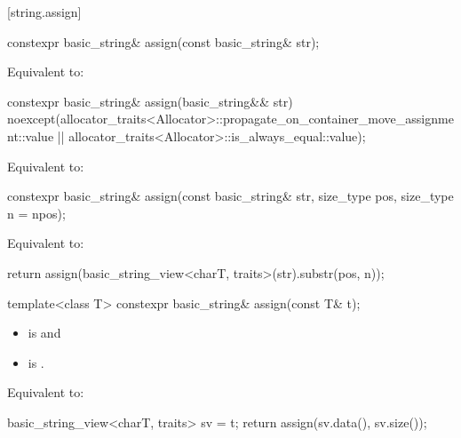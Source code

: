 [string.assign]{}

%
\begin{itemdecl}
constexpr basic_string& assign(const basic_string& str);
\end{itemdecl}

\begin{itemdescr}
\pnum
\effects
Equivalent to: 
\end{itemdescr}

%
\begin{itemdecl}
constexpr basic_string& assign(basic_string&& str)
  noexcept(allocator_traits<Allocator>::propagate_on_container_move_assignment::value ||
           allocator_traits<Allocator>::is_always_equal::value);
\end{itemdecl}

\begin{itemdescr}
\pnum
\effects
Equivalent to: 
\end{itemdescr}


%
\begin{itemdecl}
constexpr basic_string& assign(const basic_string& str, size_type pos, size_type n = npos);
\end{itemdecl}

\begin{itemdescr}
\pnum
\effects
Equivalent to:
\begin{codeblock}
return assign(basic_string_view<charT, traits>(str).substr(pos, n));
\end{codeblock}
\end{itemdescr}

%
\begin{itemdecl}
template<class T>
  constexpr basic_string& assign(const T& t);
\end{itemdecl}

\begin{itemdescr}
\pnum
\constraints
\begin{itemize}
\item
{} is
 and
\item
{} is
.
\end{itemize}

\pnum
\effects
Equivalent to:
\begin{codeblock}
basic_string_view<charT, traits> sv = t;
return assign(sv.data(), sv.size());
\end{codeblock}
\end{itemdescr}


